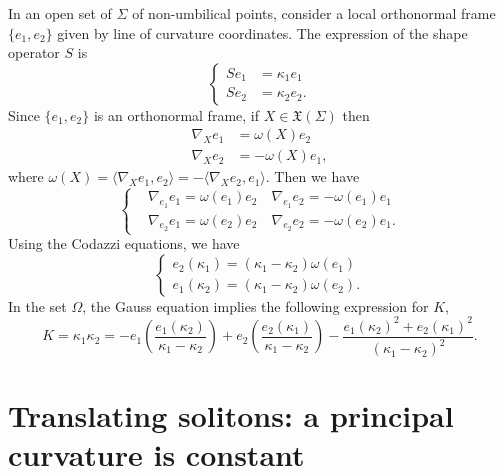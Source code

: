 \documentclass[a4paper,12pt]{amsart}
\theoremstyle{definition}
\begin{document}
In an open set of $\Sigma$ of non-umbilical points, consider a local
orthonormal frame $\{e_1,e_2\}$ given by line of curvature coordinates. The expression of the shape operator $S$ is 
\begin{equation}\label{b0}
\left\{
\begin{split}
Se_1&=\kappa_1 e_1\\
Se_2&=\kappa_2 e_2.
\end{split}
\right.
    \end{equation}
Since $\{e_1,e_2\}$ is an orthonormal frame, if $X\in\mathfrak{X}(\Sigma)$ then
\begin{equation*}
\begin{split}
\nabla_X e_1&=\omega(X)e_2\\
 \nabla_X e_2&=-\omega(X)e_1,
\end{split}
\end{equation*}
where $\omega(X)=\langle\nabla_X e_1,e_2\rangle=-\langle\nabla_X e_2,e_1\rangle$. Then we have 
\begin{equation}\label{eiej}
\left\{
\begin{split}
&\nabla_{e_1}e_1=\omega(e_1)e_2\quad \nabla_{e_1}e_2=-\omega(e_1)e_1\\
&\nabla_{e_2}e_1=\omega(e_2)e_2\quad \nabla_{e_2}e_2=-\omega(e_2)e_1.
\end{split}\right.
\end{equation}
Using the Codazzi equations, we have  
\begin{equation}\label{b1}
    \left\{
    \begin{array}{ll}
        e_{2}(\kappa_1)=(\kappa_1-\kappa_2)\omega(e_1)\\
        e_{1}(\kappa_2)=(\kappa_1-\kappa_2)\omega(e_2).
    \end{array}
    \right.
\end{equation}
In the set $\Omega$, the  Gauss equation  implies the following expression for $K$,  
\begin{equation}\label{bb}
   K=\kappa_1\kappa_2=-e_1\left(\frac{e_1( \kappa_2 )}{\kappa_1-\kappa_2} \right)+e_2\left(\frac{e_2( \kappa_1 )}{\kappa_1 -\kappa_2}\right)
   -\frac{e_1( \kappa_2)^2+ e_2( \kappa_1 )^2}{(\kappa_1 -\kappa_2)^2}.
\end{equation}

\section{Translating solitons: a principal curvature is constant}\label{s3}
\end{document}
